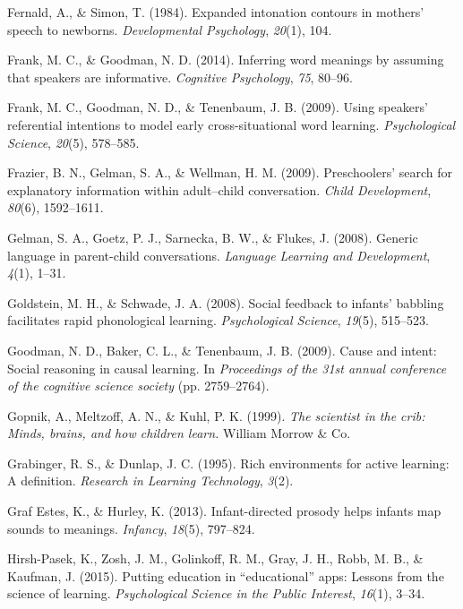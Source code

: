 \documentclass[a4paper,man,apacite,floatsintext]{apa6}
\begin{document}
\hypertarget{ref-fernald1984expanded}{}
Fernald, A., \& Simon, T. (1984). Expanded intonation contours in
mothers' speech to newborns. \emph{Developmental Psychology},
\emph{20}(1), 104.

\hypertarget{ref-frank2014inferring}{}
Frank, M. C., \& Goodman, N. D. (2014). Inferring word meanings by
assuming that speakers are informative. \emph{Cognitive Psychology},
\emph{75}, 80--96.

\hypertarget{ref-frank2009using}{}
Frank, M. C., Goodman, N. D., \& Tenenbaum, J. B. (2009). Using
speakers' referential intentions to model early cross-situational word
learning. \emph{Psychological Science}, \emph{20}(5), 578--585.

\hypertarget{ref-frazier2009preschoolers}{}
Frazier, B. N., Gelman, S. A., \& Wellman, H. M. (2009). Preschoolers'
search for explanatory information within adult--child conversation.
\emph{Child Development}, \emph{80}(6), 1592--1611.

\hypertarget{ref-gelman2008generic}{}
Gelman, S. A., Goetz, P. J., Sarnecka, B. W., \& Flukes, J. (2008).
Generic language in parent-child conversations. \emph{Language Learning
and Development}, \emph{4}(1), 1--31.

\hypertarget{ref-goldstein2008social}{}
Goldstein, M. H., \& Schwade, J. A. (2008). Social feedback to infants'
babbling facilitates rapid phonological learning. \emph{Psychological
Science}, \emph{19}(5), 515--523.

\hypertarget{ref-goodman2009cause}{}
Goodman, N. D., Baker, C. L., \& Tenenbaum, J. B. (2009). Cause and
intent: Social reasoning in causal learning. In \emph{Proceedings of the
31st annual conference of the cognitive science society} (pp.
2759--2764).

\hypertarget{ref-gopnik1999scientist}{}
Gopnik, A., Meltzoff, A. N., \& Kuhl, P. K. (1999). \emph{The scientist
in the crib: Minds, brains, and how children learn.} William Morrow \&
Co.

\hypertarget{ref-grabinger1995rich}{}
Grabinger, R. S., \& Dunlap, J. C. (1995). Rich environments for active
learning: A definition. \emph{Research in Learning Technology},
\emph{3}(2).

\hypertarget{ref-graf2013infant}{}
Graf Estes, K., \& Hurley, K. (2013). Infant-directed prosody helps
infants map sounds to meanings. \emph{Infancy}, \emph{18}(5), 797--824.

\hypertarget{ref-hirsh2015putting}{}
Hirsh-Pasek, K., Zosh, J. M., Golinkoff, R. M., Gray, J. H., Robb, M.
B., \& Kaufman, J. (2015). Putting education in ``educational'' apps:
Lessons from the science of learning. \emph{Psychological Science in the
Public Interest}, \emph{16}(1), 3--34.
\end{document}
